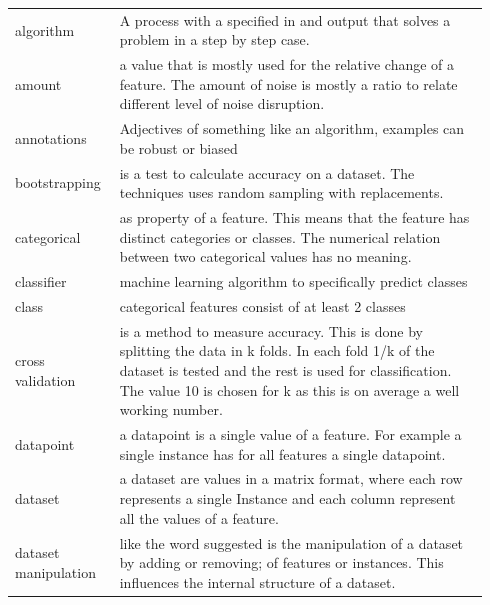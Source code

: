 \documentclass[a4paper,10pt]{article}
\begin{document}
\begin{tabular}{ p{0.20\linewidth} p{0.7437\linewidth} }
	
	algorithm & A process with a specified in and output that solves a problem in a step by step case.\\ [1ex]
	
	amount & a value that is mostly used for the relative change of a feature. The amount of noise is mostly a ratio to relate different level of noise disruption. \\[1ex]	
	
	annotations & Adjectives of something like an algorithm, examples can be robust or biased\\ [1ex]
	
	bootstrapping & is a test to calculate accuracy on a dataset. The techniques uses random sampling with replacements.  \\ [1ex]
	
	categorical & as property of a feature. This means that the feature has distinct categories or classes. The numerical relation between two categorical values has no meaning. \\ [1ex]
	
	classifier & machine learning algorithm to specifically predict classes \\ [1ex]
	
	class	 & categorical features consist of at least 2 classes\\ [1ex]
	
	cross validation & is a method to measure accuracy. This is done by splitting the data in k folds. In each fold 1/k of the dataset is tested and the rest is used for classification. The value 10 is chosen for k as this is on average a well working number\cite{Cross}. \\ [1ex]
	
	datapoint & a datapoint is a single value of a feature. For example a single instance has for all features a single datapoint.\\[1ex]
	
	dataset & a dataset are values in a matrix format, where each row represents a single Instance and each column represent all the values of a feature.\\ [1ex]
	
	dataset manipulation & like the word suggested is the manipulation of a dataset by adding or removing; of features or instances. This influences the internal structure of a dataset.  \\ [1ex]
	

\end{tabular}
\end{document}
